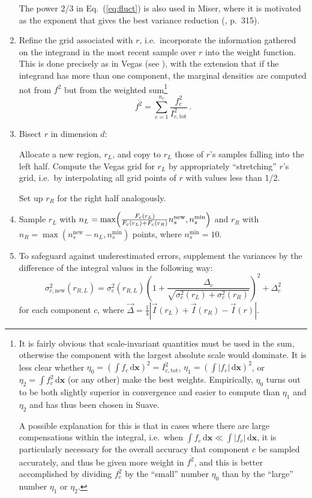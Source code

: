 \documentclass[12pt]{article}
\newcommand\ie{i.e.\ }
\newcommand\rd{\mathrm{d}}
\newcommand\nnew{n_s^{\text{new}}}
\newcommand\nmin{n_s^{\text{min}}}
\newcommand\ctot{_{c,\text{tot}}}
\newcommand\cvec[1]{\vec #1}
\newcommand\dvec[1]{\mathbf{#1}}
\begin{document}
\begin{enumerate}
The power 2/3 in Eq.~(\ref{eq:fluct}) is also used in Miser, where it is
motivated as the exponent that gives the best variance reduction
(\cite{NumRecipes}, p.~315).

\item
Refine the grid associated with $r$, \ie incorporate the information
gathered on the integrand in the most recent sample over $r$ into the
weight function.  This is done precisely as in Vegas (see
\cite{Vegas1}), with the extension that if the integrand has more than
one component, the marginal densities are computed not from $f^2$ but
from the weighted sum\footnote{%
	It is fairly obvious that scale-invariant quantities must be 
	used in the sum, otherwise the component with the largest 
	absolute scale would dominate.  It is less clear whether $\eta_0 
	= (\int f_c\,\rd\dvec x)^2 = I\ctot^2$, $\eta_1 = (\int 
	|f_c|\,\rd\dvec x)^2$, or $\eta_2 = \int f_c^2\,\rd\dvec x$ (or 
	any other) make the best weights.  Empirically, $\eta_0$ turns 
	out to be both slightly superior in convergence and easier to 
	compute than $\eta_1$ and $\eta_2$ and has thus been chosen in 
	Suave.

	A possible explanation for this is that in cases where there 
	are large compensations within the integral, \ie when $\int 
	f_c\,\rd\dvec x\ll\int |f_c|\,\rd\dvec x$, it is particularly 
	necessary for the overall accuracy that component $c$ be sampled 
	accurately, and thus be given more weight in $\overline{f^2}$, 
	and this is better accomplished by dividing $f_c^2$ by the 
	``small'' number  $\eta_0$ than by the ``large'' number $\eta_1$ 
	or $\eta_2$.}
$$
\overline{f^2} = \sum_{c = 1}^{n_c} \frac{f_c^2}{I\ctot^2}\,.
$$

\item
Bisect $r$ in dimension $d$:

Allocate a new region, $r_L$, and copy to $r_L$ those of $r$'s samples
falling into the left half.  Compute the Vegas grid for $r_L$ by
appropriately ``stretching'' $r$'s grid, \ie by interpolating all grid
points of $r$ with values less than 1/2.

Set up $r_R$ for the right half analogously.

\item
Sample $r_L$ with $n_L = \max\Bigl(\frac{F_c(r_L)}{F_c(r_L) + F_c(r_R)}
\nnew, \nmin\Bigr)$ and $r_R$ with $n_R = \max(\nnew - n_L, \nmin)$ 
points, where $\nmin = 10$.

\item
To safeguard against underestimated errors, supplement the variances 
by the difference of the integral values in the following way:
$$
\sigma_{c,\text{new}}^2(r_{R,L}) = \sigma_c^2(r_{R,L})
  \left(1 + \frac{\Delta_c}
                 {\sqrt{\sigma_c^2(r_L) + \sigma_c^2(r_R)}}\right)^2 +   
  \Delta_c^2
$$
for each component $c$, where $\cvec\Delta = \frac 14 |\cvec I(r_L) + 
\cvec I(r_R) - \cvec I(r)|$.


\end{enumerate}
\end{document}
